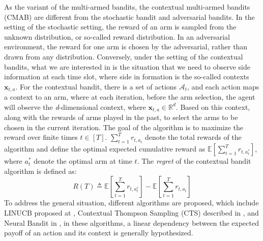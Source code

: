 As the variant of the multi-armed bandits, the contextual multi-armed bandits (CMAB) are different from the stochastic bandit and adversarial bandits. In the setting of the stochastic setting, the reward of an arm is sampled from the unknown distribution, or so-called reward distribution. In an adversarial environment, the reward for one arm is chosen by the adversarial, rather than drawn from any distribution. Conversely, under the setting of the contextual bandits, what we are interested in is the situation that we need to observe side information at each time slot, where side in formation is the so-called contexts $\mathbf{x}_{t, a}$. For the contextual bandit, there is a set of actions $\mathcal{A}_{t}$, and each action maps a context to an arm, where at each iteration, before the arm selection, the agent will observe the \textit{d}-dimensional context, where $\mathbf{x}_{t, a}\in \mathbb{R}^{d}$. Based on this context, along with the rewards of arms played in the past, to select the arms to be chosen in the current iteration. The goal of the algorithm is to maximize the reward over finite times $t\in [T]$. $\sum_{t=1}^{T} r_{t, a_{t}}$ denote the total rewards of the algorithm and define the optimal expected cumulative reward as $\mathbb{E}\left [ \sum_{t=1}^{T} r_{t, a_{t}^*} \right ]$, where $a_{t}^*$ denote the optimal arm at time $t$. The \textit{regret} of the contextual bandit algorithm is defined as:
\begin{equation}
    R(T)\triangleq\mathbb{E}\left [ \sum_{t=1}^{T} r_{t, a_{t}^*} \right ]-\mathbb{E}\left [ \sum_{t=1}^{T} r_{t, a_{t}} \right ]
\end{equation}
To address the general situation, different algorithms are proposed, which include LINUCB proposed at \cite{context}, Contextual Thompson Sampling (CTS) described in \cite{tps}, and Neural Bandit in \cite{allesiardo2014neural}, in these algorithms, a linear dependency between the expected payoff of an action and its context is generally hypothesized.